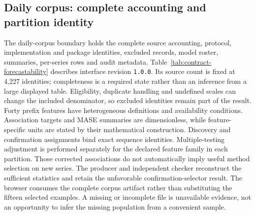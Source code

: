 \subsection{Daily corpus: complete accounting and partition identity}
\label{sec:contract-forecastability}
The daily-corpus boundary holds the complete source accounting, protocol, implementation and package identities, excluded records, model roster, summaries, per-series rows and audit metadata. Table~\ref{tab:contract-forecastability} describes interface revision \texttt{1.0.0}. Its source count is fixed at 4,227 identities; completeness is a required state rather than an inference from a large displayed table. Eligibility, duplicate handling and undefined scales can change the included denominator, so excluded identities remain part of the result. Forty prefix features have heterogeneous definitions and availability conditions. Association targets and MASE summaries are dimensionless, while feature-specific units are stated by their mathematical construction. Discovery and confirmation assignments bind exact sequence identities. Multiple-testing adjustment is performed separately for the declared feature family in each partition. Those corrected associations do not automatically imply useful method selection on new series. The producer and independent checker reconstruct the sufficient statistics and retain the unfavorable confirmation-selector result. The browser consumes the complete corpus artifact rather than substituting the fifteen selected examples. A missing or incomplete file is unavailable evidence, not an opportunity to infer the missing population from a convenient sample.


